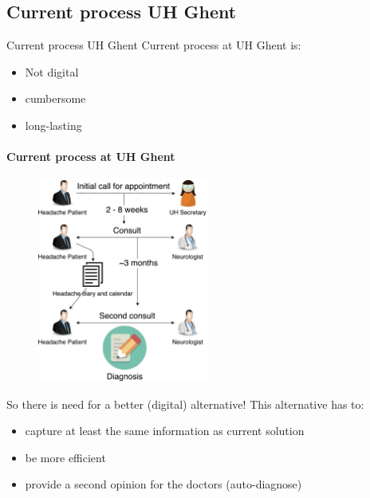 \documentclass[english]{beamer}
\begin{document}
\subsection{Current process UH Ghent}

\begin{frame}{Current process UH Ghent}
	Current process at UH Ghent is:
	\begin{itemize}
		\item Not digital
		\item cumbersome
		\item long-lasting
	\end{itemize}
\end{frame}

\begin{frame}
	\framesubtitle{Current process at UH Ghent}
	\begin{figure}[!h]
		\includegraphics[width=0.5\textwidth]{figures/UZ_patient.pdf}
	\end{figure}
\end{frame}

\begin{frame}
	So there is need for a better (digital) alternative! This alternative has to:
	\begin{itemize}
		\item capture at least the same information as current solution
		\item be more efficient
		\item provide a second opinion for the doctors (auto-diagnose)
	\end{itemize}
\end{frame}
\end{document}
